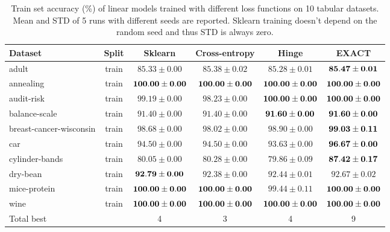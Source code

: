 \documentclass[nohyperref]{article}
\theoremstyle{plain}
\theoremstyle{definition}
\theoremstyle{remark}
\begin{document}
\begin{table*}[t]
\centering
\begin{tabular}{lc|cccc}
Dataset & Split & Sklearn & Cross-entropy & Hinge & EXACT \\
\hline

adult                   & train & $85.33 \pm 0.00$ & $85.38 \pm 0.02$ & $85.28 \pm 0.01$ & $\bf 85.47 \pm 0.01$ \\
annealing               & train & $\bf 100.00 \pm 0.00$ & $\bf 100.00 \pm 0.00$ & $\bf 100.00 \pm 0.00$ & $\bf 100.00 \pm 0.00$ \\
audit-risk              & train & $99.19 \pm 0.00$ & $98.23 \pm 0.00$ & $\bf 100.00 \pm 0.00$ & $\bf 100.00 \pm 0.00$ \\
balance-scale           & train & $91.40 \pm 0.00$ & $91.40 \pm 0.00$ & $\bf 91.60 \pm 0.00$ & $\bf 91.60 \pm 0.00$ \\
breast-cancer-wisconsin & train & $98.68 \pm 0.00$ & $98.02 \pm 0.00$ & $98.90 \pm 0.00$ & $\bf 99.03 \pm 0.11$ \\
car                     & train & $94.50 \pm 0.00$ & $94.50 \pm 0.00$ & $93.63 \pm 0.00$ & $\bf 96.67 \pm 0.00$ \\
cylinder-bands          & train & $80.05 \pm 0.00$ & $80.28 \pm 0.00$ & $79.86 \pm 0.09$ & $\bf 87.42 \pm 0.17$ \\
dry-bean                & train & $\bf 92.79 \pm 0.00$ & $92.38 \pm 0.00$ & $92.44 \pm 0.01$ & $92.67 \pm 0.02$ \\
mice-protein            & train & $\bf 100.00 \pm 0.00$ & $\bf 100.00 \pm 0.00$ & $99.44 \pm 0.11$ & $\bf 100.00 \pm 0.00$ \\
wine                    & train & $\bf 100.00 \pm 0.00$ & $\bf 100.00 \pm 0.00$ & $\bf 100.00 \pm 0.00$ & $\bf 100.00 \pm 0.00$ \\
\hline
Total best & & 4 & 3 & 4 & 9 \\



\end{tabular}
\vskip 0.2in

\caption{Train set accuracy (\%) of linear models trained with different loss functions on 10 tabular datasets. Mean and STD of 5 runs with different seeds are reported. Sklearn training doesn't depend on the random seed and thus STD is always zero.}
\label{tab:uci-train}
\end{table*}
\end{document}
